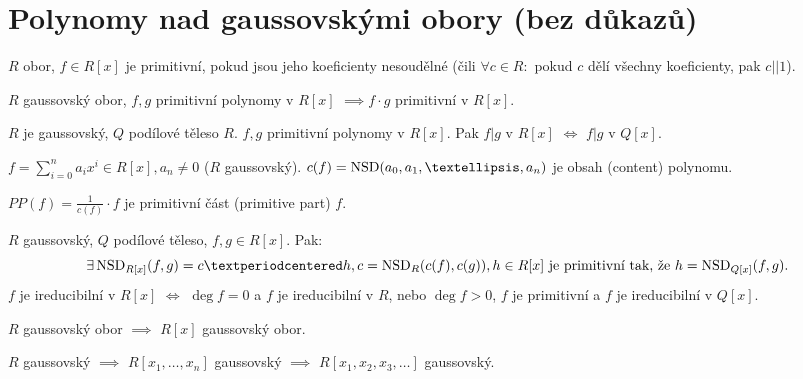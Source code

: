 \documentclass[12pt]{article}                   %
\begin{document}
\section{Polynomy nad gaussovskými obory (bez důkazů)}
    \begin{definice}
        $R$ obor, $f \in R[x]$ je primitivní, pokud jsou jeho koeficienty nesoudělné (čili $\forall c \in R:$ pokud $c$ dělí všechny koeficienty, pak $c||1$).
    \end{definice}

    \begin{veta}
        $R$ gaussovský obor, $f, g$ primitivní polynomy v $R[x]$ $\implies f·g$ primitivní v $R[x]$.
    \end{veta}

    \begin{tvrzeni}
        $R$ je gaussovský, $Q$ podílové těleso $R$. $f, g$ primitivní polynomy v $R[x]$. Pak $f|g$ v $R[x]$ $\Leftrightarrow$ $f|g$ v $Q[x]$.
    \end{tvrzeni}

    \begin{definice}[Značení]
        $f = \sum_{i=0}^n a_ix^i \in R[x], a_n ≠ 0$ ($R$ gaussovský). $c(f) = \NSD(a_0, a_1, …, a_n)$ je obsah (content) polynomu.

        $PP(f) = \frac{1}{c(f)}·f$ je primitivní část (primitive part) $f$.
    \end{definice}

    \begin{veta}
        $R$ gaussovský, $Q$ podílové těleso, $f, g \in R[x]$. Pak:
        $$ \exists \NSD_{R[x]} (f, g) = c·h, c = \NSD_R(c(f), c(g)), h \in R[x]\text{ je primitivní tak, že } h = \NSD_{Q[x]}(f, g). $$
        $f$ je ireducibilní v $R[x]$ $\Leftrightarrow$ $\deg f = 0$ a $f$ je ireducibilní v $R$, nebo $\deg f > 0$, $f$ je primitivní a $f$ je ireducibilní v $Q[x]$.
    \end{veta}

    \begin{veta}[Gaussova]
        $R$ gaussovský obor $\implies$ $R[x]$ gaussovský obor.
    \end{veta}

    \begin{dusledek}
        $R$ gaussovský $\implies$ $R[x_1, …, x_n]$ gaussovský $\implies$ $R[x_1, x_2, x_3, …]$ gaussovský.
    \end{dusledek}
\end{document}
